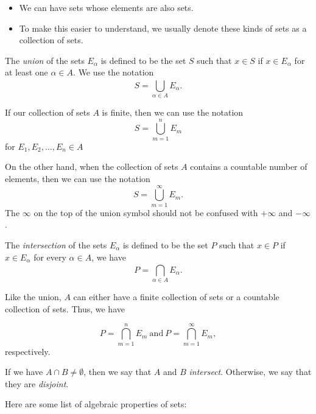 \documentclass[11pt,a4paper]{book}
\begin{document}
\begin{itemize}
    \item We can have sets whose elements are also sets. 
    \item To make this easier to understand, we usually denote these kinds of sets as a collection of sets.
\end{itemize}

\begin{definition}[Union]
    The \textit{union} of the sets \( {E}_{\alpha} \) is defined to be the set \( S  \) such that \( x \in S  \) if \( x \in {E}_{\alpha} \) for at least one \( \alpha \in A  \). We use the notation   
    \[  S = \bigcup_{ \alpha \in A  }^{  }  {E}_{\alpha}. \]
\end{definition}

If our collection of sets \( A  \) is finite, then we can use the notation
\[  S = \bigcup_{ m=  1  }^{ n  }  {E}_{m} \]
for \( {E}_{1}, {E}_{2}, \dots, {E}_{n} \in A  \)

On the other hand, when the collection of sets \( A  \) contains a countable number of elements, then we can use the notation
\[  S = \bigcup_{ m = 1  }^{ \infty  }  {E}_{m}. \]
The \( \infty  \) on the top of the union symbol should not be confused with \( + \infty   \) and \( - \infty  \).

\begin{definition}[Intersection]
    The \textit{intersection} of the sets \( {E}_{\alpha} \) is defined to be the set \( P  \) such that \( x \in P  \) if \( x \in {E}_{\alpha} \) for every \( \alpha \in A  \), we have
    \[  P = \bigcap_{ \alpha \in A  }^{  }  {E}_{\alpha}. \]
\end{definition}

Like the union, \( A  \) can either have a finite collection of sets or a countable collection of sets. Thus, we have

\[  P = \bigcap_{ m=1  }^{ n } {E}_{m} \  \text{and} \ P = \bigcap_{  m = 1  }^{ \infty  } {E}_{m},  \]
respectively.

\begin{definition}
    If we have \( A \cap B \neq \emptyset  \), then we say that \( A  \) and \( B  \) \textit{intersect}. Otherwise, we say that they are \textit{disjoint}. 
\end{definition}

Here are some list of algebraic properties of sets:
\end{document}
